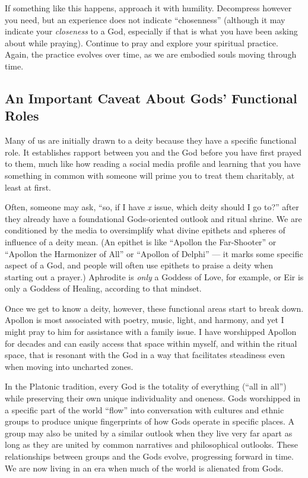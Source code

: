 \documentclass[
]{book}
\begin{document}
If something like this happens, approach it with humility. Decompress however you need, but an experience does not indicate ``chosenness'' (although it may indicate your \emph{closeness} to a God, especially if that is what you have been asking about while praying). Continue to pray and explore your spiritual practice. Again, the practice evolves over time, as we are embodied souls moving through time.

\hypertarget{an-important-caveat-about-gods-functional-roles}{%
\subsection{An Important Caveat About Gods' Functional Roles}\label{an-important-caveat-about-gods-functional-roles}}

Many of us are initially drawn to a deity because they have a specific functional role. It establishes rapport between you and the God before you have first prayed to them, much like how reading a social media profile and learning that you have something in common with someone will prime you to treat them charitably, at least at first.

Often, someone may ask, ``so, if I have \emph{x} issue, which deity should I go to?'' after they already have a foundational Gods-oriented outlook and ritual shrine. We are conditioned by the media to oversimplify what divine epithets and spheres of influence of a deity mean. (An epithet is like ``Apollon the Far-Shooter'' or ``Apollon the Harmonizer of All'' or ``Apollon of Delphi'' --- it marks some specific aspect of a God, and people will often use epithets to praise a deity when starting out a prayer.) Aphrodite is \emph{only} a Goddess of Love, for example, or Eir is only a Goddess of Healing, according to that mindset.

Once we get to know a deity, however, these functional areas start to break down. Apollon is most associated with poetry, music, light, and harmony, and yet I might pray to him for assistance with a family issue. I have worshipped Apollon for decades and can easily access that space within myself, and within the ritual space, that is resonant with the God in a way that facilitates steadiness even when moving into uncharted zones.

In the Platonic tradition, every God is the totality of everything (``all in all'') while preserving their own unique individuality and oneness. Gods worshipped in a specific part of the world ``flow'' into conversation with cultures and ethnic groups to produce unique fingerprints of how Gods operate in specific places. A group may also be united by a similar outlook when they live very far apart as long as they are united by common narratives and philosophical outlooks. These relationships between groups and the Gods evolve, progressing forward in time. We are now living in an era when much of the world is alienated from Gods.
\end{document}
